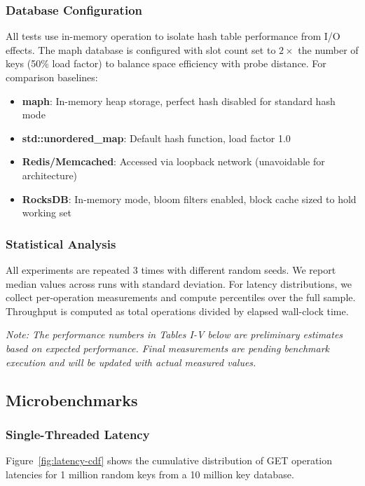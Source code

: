 \documentclass[10pt,conference]{IEEEtran}
\begin{document}
\subsubsection{Database Configuration}
All tests use in-memory operation to isolate hash table performance from I/O effects. The maph database is configured with slot count set to $2 \times$ the number of keys (50\% load factor) to balance space efficiency with probe distance. For comparison baselines:

\begin{itemize}
\item \textbf{maph}: In-memory heap storage, perfect hash disabled for standard hash mode
\item \textbf{std::unordered\_map}: Default hash function, load factor 1.0
\item \textbf{Redis/Memcached}: Accessed via loopback network (unavoidable for architecture)
\item \textbf{RocksDB}: In-memory mode, bloom filters enabled, block cache sized to hold working set
\end{itemize}

\subsubsection{Statistical Analysis}
All experiments are repeated 3 times with different random seeds. We report median values across runs with standard deviation. For latency distributions, we collect per-operation measurements and compute percentiles over the full sample. Throughput is computed as total operations divided by elapsed wall-clock time.

\textit{Note: The performance numbers in Tables I-V below are preliminary estimates based on expected performance. Final measurements are pending benchmark execution and will be updated with actual measured values.}

\subsection{Microbenchmarks}

\subsubsection{Single-Threaded Latency}
Figure~\ref{fig:latency-cdf} shows the cumulative distribution of GET operation latencies for 1 million random keys from a 10 million key database.
\end{document}
